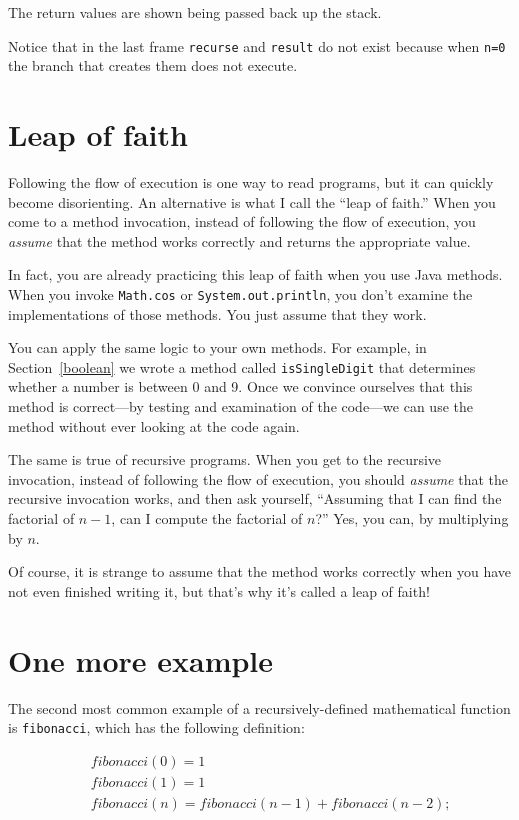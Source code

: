 The return values are shown being passed back up the stack.

Notice that in the last frame {\tt recurse} and {\tt result} do not
exist because when {\tt n=0} the branch that creates them does not
execute.


\section{Leap of faith}
\label{leap of faith}

Following the flow of execution is one way to read programs, but it can
quickly become disorienting.  An alternative is what I call the ``leap
of faith.''  When you come to a method invocation, instead of
following the flow of execution, you {\em assume} that the method
works correctly and returns the appropriate value.

In fact, you are already practicing this leap of faith
when you use Java methods.  When you invoke {\tt Math.cos}
or {\tt System.out.println}, you don't examine the implementations of
those methods.  You just assume that they work.

You can apply the same logic to your own methods.
For example, in Section~\ref{boolean} we wrote a method called
{\tt isSingleDigit} that determines whether a number is between
0 and 9.  Once we convince ourselves that this method
is correct---by testing and examination of the code---we can
use the method without ever looking at the code again.

The same is true of recursive programs.  When you get to
the recursive invocation, instead of following the flow of
execution, you should {\em assume} that the recursive invocation
works, and then ask yourself,
``Assuming that I can find the factorial of $n-1$, can I
compute the factorial of $n$?''  Yes, you can, by multiplying by $n$.

Of course, it is strange to assume that the method
works correctly when you have not even finished writing it,
but that's why it's called a leap of faith!


\section{One more example}
\label{fibonacci}

The second most common example of a recursively-defined
mathematical function is {\tt fibonacci}, which has the
following definition:

\begin{eqnarray*}
&& fibonacci(0) = 1 \\
&& fibonacci(1) = 1 \\
&& fibonacci(n) = fibonacci(n-1) + fibonacci(n-2);
\end{eqnarray*}

